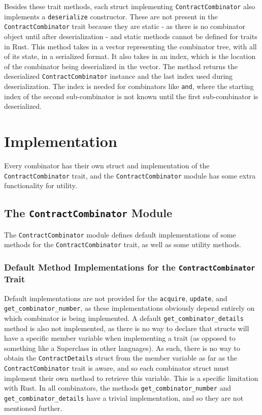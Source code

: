 Besides these trait methods, each struct implementing \texttt{ContractCombinator} also implements a \texttt{deserialize} constructor. These are not present in the \texttt{ContractCombinator} trait because they are static - as there is no combinator object until after deserialization - and static methods cannot be defined for traits in Rust. This method takes in a vector representing the combinator tree, with all of its state, in a serialized format. It also takes in an index, which is the location of the combinator being deserialized in the vector. The method returns the deserialized \texttt{ContractCombinator} instance and the last index used during deserialization. The index is needed for combinators like \texttt{and}, where the starting index of the second sub-combinator is not known until the first sub-combinator is deserialized.


\section{Implementation} \label{combinator-implementation}

Every combinator has their own struct and implementation of the \texttt{ContractCombinator} trait, and the \texttt{ContractCombinator} module has some extra functionality for utility.


\subsection{The \texttt{ContractCombinator} Module}

The \texttt{ContractCombinator} module defines default implementations of some methods for the \linebreak\texttt{ContractCombinator} trait, as well as some utility methods.


\subsubsection{Default Method Implementations for the \texttt{ContractCombinator} Trait}

Default implementations are not provided for the \texttt{acquire}, \texttt{update}, and \texttt{get\_combinator\_number}, as these implementations obviously depend entirely on which combinator is being implemented. A default \texttt{get\_combinator\_details} method is also not implemented, as there is no way to declare that structs will have a specific member variable when implementing a trait (as opposed to something like a Superclass in other languages). As such, there is no way to obtain the \texttt{ContractDetails} struct from the member variable as far as the \texttt{ContractCombinator} trait is aware, and so each combinator struct must implement their own method to retrieve this variable. This is a specific limitation with Rust. In all combinators, the methods \texttt{get\_combinator\_number} and \texttt{get\_combinator\_details} have a trivial implementation, and so they are not mentioned further. \\

